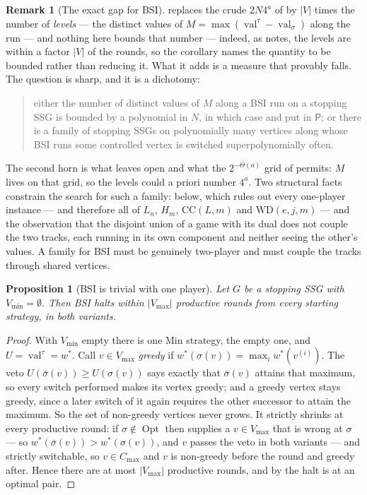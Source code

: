 \documentclass[11pt]{article}
\theoremstyle{plain}
\newtheorem{proposition}[theorem]{Proposition}
\theoremstyle{definition}
\newtheorem{remark}[theorem]{Remark}
\DeclareMathOperator{\val}{val}
\DeclareMathOperator{\Opt}{Opt}
\newcommand{\Vmax}{V_{\max}}
\newcommand{\Vmin}{V_{\min}}
\begin{document}
\begin{remark}[The exact gap for BSI]\label{rem:bsi-gap}
 replaces the crude $2N4^{a}$ of
 by $|V|$ times the number of \emph{levels} --- the
distinct values of $M=\max(\val^\tau-\val_\sigma)$ along the run --- and
nothing here bounds that number --- indeed, as 
notes, the levels are within a factor $|V|$ of the rounds, so the
corollary names the quantity to be bounded rather than reducing it. What
it adds is a measure that provably falls. The question is sharp, and it is
a dichotomy:
\begin{quote}
either the number of distinct values of $M$ along a BSI run on a stopping
SSG is bounded by a polynomial in $N$, in which case
 and  put
 in $\mathsf P$; or there is a family of stopping SSGs on
polynomially many vertices along whose BSI runs some controlled vertex is
switched superpolynomially often.
\end{quote}
The second horn is what  leaves open and what the
$2^{-\Theta(a)}$ grid of  permits: $M$ lives
on that grid, so the levels could a priori number $4^{a}$. Two structural
facts constrain the search for such a family: 
below, which rules out every one-player instance --- and therefore all of
$L_n$, $H_m$, $\mathrm{CC}(L,m)$ and $\mathrm{WD}(e,j,m)$ --- and the
observation that the disjoint union of a game with its dual does not
couple the two tracks, each running in its own component and neither
seeing the other's values. A family for BSI must be genuinely two-player
and must couple the tracks through shared vertices.
\end{remark}

\begin{proposition}[BSI is trivial with one player]\label{prop:bsi-oneplayer}
Let $G$ be a stopping SSG with $\Vmin=\emptyset$. Then BSI halts within
$|\Vmax|$ productive rounds from every starting strategy, in both
variants.
\end{proposition}

\begin{proof}
With $\Vmin$ empty there is one Min strategy, the empty one, and
$U=\val^\tau=w^\ast$. Call $v\in\Vmax$ \emph{greedy} if
$w^\ast(\sigma(v))=\max_iw^\ast(v^{(i)})$. The veto
$U(\bar\sigma(v))\ge U(\sigma(v))$ says exactly that $\bar\sigma(v)$
attains that maximum, so every switch performed makes its vertex greedy;
and a greedy vertex stays greedy, since a later switch of it again
requires the other successor to attain the maximum. So the set of
non-greedy vertices never grows. It strictly shrinks at every productive
round: if $\sigma\notin\Opt$ then  supplies a
$v\in\Vmax$ that is wrong at $\sigma$ --- so
$w^\ast(\bar\sigma(v))>w^\ast(\sigma(v))$, and $v$ passes the veto in
both variants --- and strictly switchable, so $v\in C_{\max}$ and $v$ is
non-greedy before the round and greedy after. Hence there are at most
$|\Vmax|$ productive rounds, and by  the halt is at
an optimal pair.
\end{proof}
\end{document}
